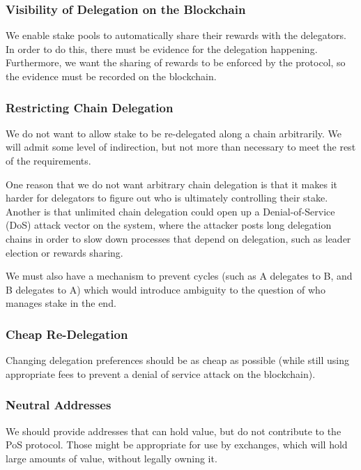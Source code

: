 \documentclass[11pt,a4paper]{article}
\begin{document}
\subsubsection{Visibility of Delegation on the
Blockchain}\label{visibility-of-delegation-on-the-blockchain}

We enable stake pools to automatically share their rewards with the
delegators. In order to do this, there must be evidence for the
delegation happening. Furthermore, we want the sharing of rewards to be
enforced by the protocol, so the evidence must be recorded on the
blockchain.

\subsubsection{Restricting Chain
Delegation}\label{restricting-chain-delegation}

We do not want to allow stake to be re-delegated along a chain
arbitrarily. We will admit some level of indirection, but not more than
necessary to meet the rest of the requirements.

One reason that we do not want arbitrary chain delegation is that it
makes it harder for delegators to figure out who is ultimately
controlling their stake. Another is that unlimited chain delegation
could open up a Denial-of-Service (DoS) attack vector on the system,
where the attacker posts long delegation chains in order to slow down
processes that depend on delegation, such as leader election or rewards
sharing.

We must also have a mechanism to prevent cycles (such as A delegates to
B, and B delegates to A) which would introduce ambiguity to the question
of who manages stake in the end.

\subsubsection{Cheap Re-Delegation}\label{cheap-re-delegation}

Changing delegation preferences should be as cheap as possible (while
still using appropriate fees to prevent a denial of service attack on
the blockchain).

\subsubsection{Neutral Addresses}\label{neutral-addresses}

We should provide addresses that can hold value, but do not contribute
to the PoS protocol. Those might be appropriate for use by exchanges,
which will hold large amounts of value, without legally owning it.
\end{document}
